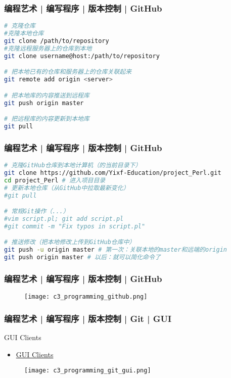 \begin{frame}[fragile]
  \frametitle{编程艺术 | 编写程序 | 版本控制 | \alert{GitHub}}
  \vspace{-1.5em}
\begin{lstlisting}[language=sh]
# 克隆仓库
#克隆本地仓库
git clone /path/to/repository
#克隆远程服务器上的仓库到本地
git clone username@host:/path/to/repository

# 把本地已有的仓库和服务器上的仓库关联起来
git remote add origin <server>

# 把本地库的内容推送到远程库
git push origin master

# 把远程库的内容更新到本地库
git pull
\end{lstlisting}
\end{frame}

\begin{frame}[fragile]
  \frametitle{编程艺术 | 编写程序 | 版本控制 | GitHub}
  \vspace{-1.5em}
\begin{lstlisting}[language=sh]
# 克隆GitHub仓库到本地计算机（的当前目录下）
git clone https://github.com/Yixf-Education/project_Perl.git
cd project_Perl # 进入项目目录
# 更新本地仓库（从GitHub中拉取最新变化）
#git pull

# 常规Git操作（...）
#vim script.pl; git add script.pl
#git commit -m "Fix typos in script.pl" 

# 推送修改（把本地修改上传到GitHub仓库中）
git push -u origin master # 第一次：关联本地的master和远端的origin
git push origin master # 以后：就可以简化命令了
\end{lstlisting}
\end{frame}

\begin{frame}
  \frametitle{编程艺术 | 编写程序 | 版本控制 | GitHub}
  \begin{figure}
    \centering
    \texttt{[image: c3\_programming\_github.png]}
  \end{figure}
\end{frame}

\begin{frame}
  \frametitle{编程艺术 | 编写程序 | 版本控制 | Git | GUI}
  \begin{block}{GUI Clients}
    \begin{itemize}
      \item \href{https://git-scm.com/downloads/guis}{GUI Clients}
    \end{itemize}
  \end{block}
  \begin{figure}
    \centering
    \texttt{[image: c3\_programming\_git\_gui.png]}
  \end{figure}
\end{frame}

